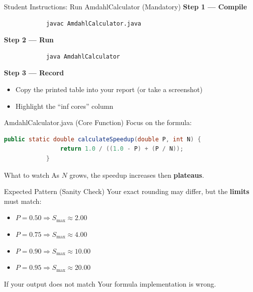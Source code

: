 \documentclass[11pt]{beamer}
\begin{document}
	\begin{frame}[fragile]{Student Instructions: Run AmdahlCalculator (Mandatory)}
		\textbf{Step 1 --- Compile}
		\begin{lstlisting}
			javac AmdahlCalculator.java
		\end{lstlisting}
		

		\textbf{Step 2 --- Run}
		\begin{lstlisting}
			java AmdahlCalculator
		\end{lstlisting}
		

		\textbf{Step 3 --- Record}
		\begin{itemize}
			\item Copy the printed table into your report (or take a screenshot)
			\item Highlight the ``inf cores'' column
		\end{itemize}
	\end{frame}
	
	\begin{frame}[fragile]{AmdahlCalculator.java (Core Function)}
		Focus on the formula:
		
		\begin{lstlisting}[language=Java]
			public static double calculateSpeedup(double P, int N) {
				return 1.0 / ((1.0 - P) + (P / N));
			}
		\end{lstlisting}
		

		\begin{block}{What to watch}
			As $N$ grows, the speedup increases then \textbf{plateaus}.
		\end{block}
	\end{frame}
	
	\begin{frame}{Expected Pattern (Sanity Check)}
		Your exact rounding may differ, but the \textbf{limits} must match:
		
		\begin{itemize}
			\item $P=0.50 \Rightarrow S_{\max} \approx 2.00$
			\item $P=0.75 \Rightarrow S_{\max} \approx 4.00$
			\item $P=0.90 \Rightarrow S_{\max} \approx 10.00$
			\item $P=0.95 \Rightarrow S_{\max} \approx 20.00$
		\end{itemize}
		

		\begin{alertblock}{If your output does not match}
			Your formula implementation is wrong.
		\end{alertblock}
	\end{frame}
	
\end{document}

